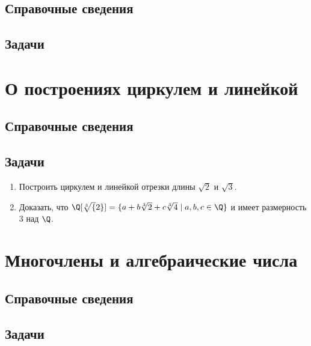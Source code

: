 \subsection*{Справочные сведения}

\subsection*{Задачи}



\section{О построениях циркулем и линейкой}

\subsection*{Справочные сведения}

\subsection*{Задачи}

\begin{enumerate}
\item Построить циркулем и линейкой отрезки длины $\sqrt 2$ и $\sqrt 3$.
\item Доказать, что $\Q[\sqrt[3]{2}]=\{a+b\sqrt[3]{2}+c\sqrt[3]{4}\;|\;a,b,c\in\Q\}$ и имеет размерность 3 над $\Q$.
\end{enumerate}





\section{Многочлены и алгебраические числа}

\subsection*{Справочные сведения}

\subsection*{Задачи}




\begin{comment}
\chapter{15. Континуум}
\end{comment}


